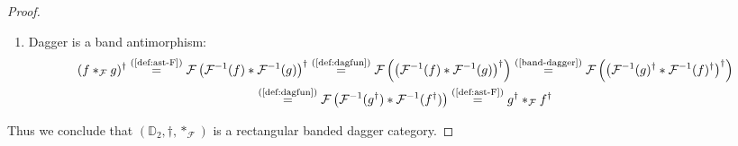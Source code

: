 \documentclass[10pt]{article}
\begin{document}
\begin{proof}
\begin{enumerate}[{\em (i)}]
\begin{gather*}
f \circ (g \ast_\mathcal{F} h) \circ k \overset{\text{(\ref{def:ast-F})}}{=} f \circ \mathcal{F}\left( \mathcal{F}^{-1}(g) \ast \mathcal{F}^{-1}(h) \right) \circ k \overset{\text{$\mathcal{F}$ iso.}}{=} \mathcal{F}(\mathcal{F}^{-1}(f)) \circ \mathcal{F}\left( \mathcal{F}^{-1}(g) \ast \mathcal{F}^{-1}(h) \right) \circ \mathcal{F}(\mathcal{F}^{-1}(k)) \\\overset{\text{(\ref{def:functor})}}{=} \mathcal{F}\left( \mathcal{F}^{-1}(f) \circ \left( \mathcal{F}^{-1}(g) \ast \mathcal{F}^{-1}(h) \right) \circ \mathcal{F}^{-1}(k) \right) \\\overset{\text{(\ref{band-comp})}}{=} \mathcal{F}\left( \left(\mathcal{F}^{-1}(f) \circ \mathcal{F}^{-1}(g) \circ \mathcal{F}^{-1}(k) \right) \ast \left(\mathcal{F}^{-1}(f) \circ \mathcal{F}^{-1}(h) \circ \mathcal{F}^{-1}(k) \right) \right) \\\overset{\text{(\ref{def:functor})}}{=} \mathcal{F}\left( \mathcal{F}^{-1}(f \circ g \circ k) \ast \mathcal{F}^{-1}(f \circ h \circ k) \right)\overset{\text{(\ref{def:ast-F})}}{=}  (f \circ g \circ k) \ast_\mathcal{F} (f \circ h \circ k)
\end{gather*}
\item Dagger is a band antimorphism: 
\begin{gather*}
(f \ast_\mathcal{F} g)^\dagger \overset{\text{(\ref{def:ast-F})}}{=} \mathcal{F}\left( \mathcal{F}^{-1}(f) \ast \mathcal{F}^{-1}(g) \right)^\dagger \overset{\text{(\ref{def:dagfun})}}{=} \mathcal{F}\left( \left( \mathcal{F}^{-1}(f) \ast \mathcal{F}^{-1}(g) \right)^\dagger \right) \overset{\text{(\ref{band-dagger})}}{=}  \mathcal{F}\left( \left( \mathcal{F}^{-1}(g)^\dagger \ast \mathcal{F}^{-1}(f)^\dagger \right)^\dagger \right)\\
\overset{\text{(\ref{def:dagfun})}}{=}  \mathcal{F}\left( \mathcal{F}^{-1}(g^\dagger) \ast \mathcal{F}^{-1}(f^\dagger) \right) \overset{\text{(\ref{def:ast-F})}}{=} g^\dagger \ast_\mathcal{F} f^\dagger
\end{gather*}
\end{enumerate}
Thus we conclude that $(\mathbb{D}_2,\dagger, \ast_\mathcal{F})$ is a rectangular banded dagger category. 
\end{proof}
\end{document}
